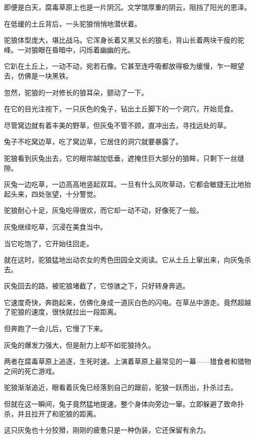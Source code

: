 
\begin{this_body}



即便是白天，腐毒草原上也是一片阴沉。文学馆厚重的阴云，阻挡了阳光的恩泽。

在低缓的土丘背后，一头驼狼悄悄地潜伏着。

驼狼体型庞大，堪比战马。它浑身长着又黑又长的狼毛，背山长着两块干瘦的驼峰。一对狼眼在昏暗中，闪烁着幽幽的光。

它趴在土丘上，一动不动，宛若石像。它甚至连呼吸都放得极为缓慢，乍一眼望去，仿佛是一块黑铁。

忽然，驼狼的一对修长的狼耳朵，颤动了一下。

在它的目光注视下，一只灰色的兔子，钻出土丘脚下的一个洞穴，开始觅食。

尽管窝边就有着丰美的野草，但灰兔不管不顾，直冲出去，寻找远处的草。

兔子不吃窝边草，吃了窝边草，它居住的洞穴就要暴露了。

驼狼看到灰兔出去，它的眼帘越加低垂，遮掩住巨大部分的狼眸，只剩下一丝缝隙。

灰兔一边吃草，一边高高地竖起双耳。一旦有什么风吹草动，它都会敏捷无比地抬起头来，四处张望，十分警觉。

驼狼耐心十足，灰兔吃得很欢，而它却一动不动，好像死了一般。

灰兔继续吃草，沉浸在美食当中。

当它吃饱了，它开始往回走。

就在这时，驼狼猛地出动农女的秀色田园全文阅读。它从土丘上窜出来，向灰兔杀去。

灰兔回去的路，被驼狼堵截了，它惊骇之下，只好转身奔逃。

它速度奇快，奔跑起来，仿佛化身成一道灰白色的闪电。在草丛中游走。竟然超越了驼狼的速度，很快就拉出一段距离。

但奔跑了一会儿后，它慢了下来。

灰兔的爆发力强大，但是耐力上却不如驼狼持久。

两者在腐毒草原上追逐，生死时速。上演着草原上最常见的一幕——猎食者和猎物之间的死亡游戏。

驼狼渐渐追近，眼看着灰兔已经落到自己的跟前，驼狼一跃而出，扑杀过去。

但就在这一瞬间，兔子竟然猛地提速。整个身体向旁边一窜。立即躲避了致命扑杀，并且拉开了和驼狼的距离。

这只灰兔也十分狡猾，刚刚的疲惫只是一种伪装，它还保留有余力。


\end{this_body}

